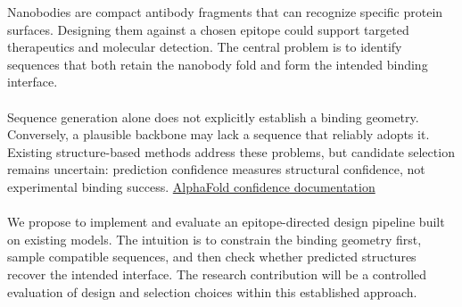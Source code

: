 Nanobodies are compact antibody fragments that can recognize specific protein surfaces. Designing them against a chosen epitope could support targeted therapeutics and molecular detection. The central problem is to identify sequences that both retain the nanobody fold and form the intended binding interface.\\\\
Sequence generation alone does not explicitly establish a binding geometry. Conversely, a plausible backbone may lack a sequence that reliably adopts it. Existing structure-based methods address these problems, but candidate selection remains uncertain: prediction confidence measures structural confidence, not experimental binding success. \href{https://www.ebi.ac.uk/training/online/courses/alphafold/inputs-and-outputs/evaluating-alphafolds-predicted-structures-using-confidence-scores/confidence-scores-in-alphafold-multimer/}{AlphaFold confidence documentation}\\\\
We propose to implement and evaluate an epitope-directed design pipeline built on existing models. The intuition is to constrain the binding geometry first, sample compatible sequences, and then check whether predicted structures recover the intended interface. The research contribution will be a controlled evaluation of design and selection choices within this established approach.

